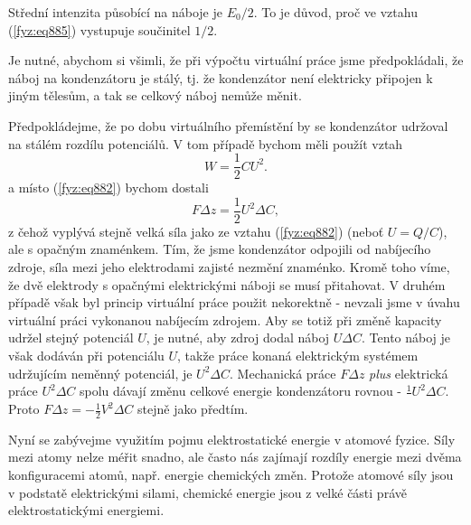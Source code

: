    Střední intenzita působící na náboje je \(E_0/2\). To je důvod, proč ve vztahu (\ref{fyz:eq885})
    vystupuje součinitel \(1/2\).

    Je nutné, abychom si všimli, že při výpočtu virtuální práce jsme předpokládali, že náboj na
    kondenzátoru je stálý, tj. že kondenzátor není elektricky připojen k jiným tělesům, a tak se
    celkový náboj nemůže měnit. 
    
    Předpokládejme, že po dobu virtuálního přemístění by se kondenzátor udržoval na stálém rozdílu
    potenciálů. V tom případě bychom měli použít vztah
    \begin{equation*}
      W = \dfrac{1}{2}CU^2.
    \end{equation*}
    a místo (\ref{fyz:eq882}) bychom dostali
    \begin{equation*}
      FΔz=\dfrac{1}{2}U^2ΔC,
    \end{equation*}
    z čehož vyplývá stejně velká síla jako ze vztahu (\ref{fyz:eq882}) (neboť \(U= Q/C\)), ale s
    opačným znaménkem. Tím, že jsme kondenzátor odpojili od nabíjecího zdroje, síla mezi jeho
    elektrodami zajisté nezmění znaménko. Kromě toho víme, že dvě elektrody s opačnými elektrickými
    náboji se musí přitahovat. V druhém případě však byl princip virtuální práce použit nekorektně -
    nevzali jsme v úvahu virtuální práci vykonanou nabíjecím zdrojem. Aby se totiž při změně
    kapacity udržel stejný potenciál \(U\), je nutné, aby zdroj dodal náboj \(U\Delta C\). Tento
    náboj je však dodáván při potenciálu \(U\), takže práce konaná elektrickým systémem udržujícím
    neměnný potenciál, je \(U^2\Delta C\). Mechanická práce \(F\Delta z\) \emph{plus} elektrická
    práce \(U^2\Delta C\) spolu dávají změnu celkové energie kondenzátoru rovnou -
    \(\frac{1}{}U^2\Delta C\). Proto \(FΔz=−\frac{1}{2}V^2ΔC\) stejně jako předtím.
    
  
    Nyní se zabývejme využitím pojmu elektrostatické energie v atomové fyzice. Síly mezi atomy nelze
    méřit snadno, ale často nás zajímají rozdíly energie mezi dvěma konfiguracemi atomů, např.
    energie chemických změn. Protože atomové síly jsou v podstatě elektrickými silami, chemické
    energie jsou z velké části právě elektrostatickými energiemi.
    
